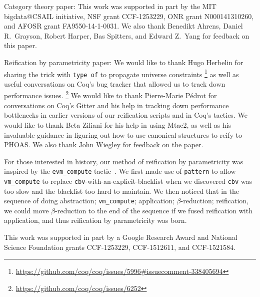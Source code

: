 Category theory paper: This work was supported in part by the MIT bigdata@CSAIL initiative, NSF grant CCF-1253229, ONR grant N000141310260, and AFOSR grant FA9550-14-1-0031.  We also thank Benedikt Ahrens, Daniel R.~Grayson, Robert Harper, Bas Spitters, and Edward Z.~Yang for feedback on this paper.

Reification by parametricity paper:
We would like to thank Hugo Herbelin for sharing the trick with \texttt{type of} to propagate universe constraints%
\footnote{%
    \url{https://github.com/coq/coq/issues/5996\#issuecomment-338405694}%
}
as well as useful conversations on Coq's bug tracker that allowed us to track down performance issues.%
\footnote{%
    \url{https://github.com/coq/coq/issues/6252}%
}
We would like to thank Pierre-Marie P\'edrot for conversations on Coq's Gitter and his help in tracking down performance bottlenecks in earlier versions of our reification scripts and in Coq's tactics.
We would like to thank Beta Ziliani for his help in using Mtac2, as well as his invaluable guidance in figuring out how to use canonical structures to reify to PHOAS.
We also thank John Wiegley for feedback on the paper.

For those interested in history, our method of reification by parametricity was inspired by the \texttt{evm\_compute} tactic~\cite{MirrorShardITP14}.
We first made use of \texttt{pattern} to allow \texttt{vm\_compute} to replace \texttt{cbv}-with-an-explicit-blacklist when we discovered \texttt{cbv} was too slow and the blacklist too hard to maintain.
We then noticed that in the sequence of doing abstraction; \texttt{vm\_compute}; application; $\beta$-reduction; reification, we could move $\beta$-reduction to the end of the sequence if we fused reification with application, and thus reification by parametricity was born.

This work was supported in part by a Google Research Award and National Science Foundation grants CCF-1253229, CCF-1512611, and CCF-1521584.



